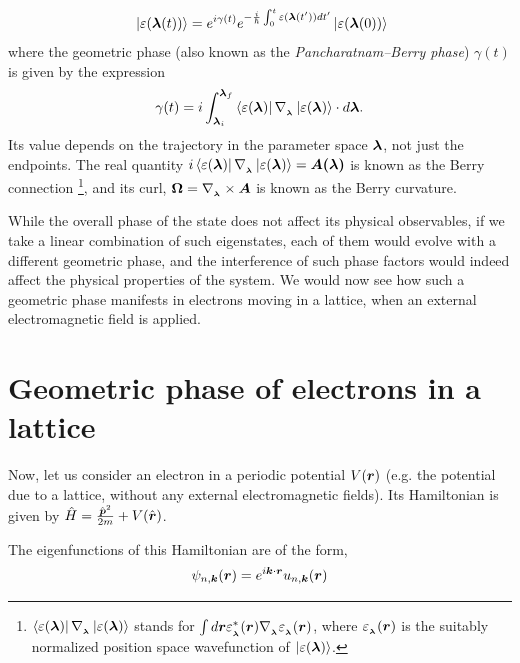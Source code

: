 \documentclass{report}
\renewcommand\vec[1]{\ensuremath\boldsymbol{#1}} %
\begin{document}
\begin{equation}~\label{Eq:BerryPhaseOriginal}
	\ket{\varepsilon(\vec{\lambda}(t))} = e^{i \gamma(t)} e^{-\frac{i}{\hbar} \int_0^t \varepsilon(\vec{\lambda}(t')) dt'} \ket{\varepsilon(\vec{\lambda}(0))}
\end{equation}
where the geometric phase (also known as the \textit{Pancharatnam–Berry phase}) $\gamma(t)$ is given by the expression $$\gamma(t) = i\int_{\vec{\lambda}_i}^{\vec{\lambda}_f} \bra{\varepsilon({\vec{\lambda}})}\nabla_{_{\vec{\lambda}}} \ket{\varepsilon({\vec{\lambda}})} \cdot d \vec{\lambda}.$$ Its value depends on the trajectory in the parameter space $\vec{\lambda}$, not just the endpoints. The real quantity $i\bra{\varepsilon({\vec{\lambda}})}\nabla_{_{\vec{\lambda}}}\ket{\varepsilon({\vec{\lambda}})} = \vec{A(\vec{\lambda})}$ is known as the Berry connection  \footnote{$\bra{\varepsilon({\vec{\lambda}})}\nabla_{_{\vec{\lambda}}} \ket{\varepsilon({\vec{\lambda}})}$ stands for $\int d\vec{r} \varepsilon_{_{\vec{\lambda}}}^* (\vec{r}) \nabla_{_{\vec{\lambda}}} \varepsilon_{_{\vec{\lambda}}}(\vec{r})$, where $\varepsilon_{_{\vec{\lambda}}}(\vec{r})$ is the suitably normalized position space wavefunction of $\ket{\varepsilon({\vec{\lambda}})}$.}, and its curl, $\vec{\Omega} = \nabla_{_{\vec{\lambda}}} \times \vec{A}$ is known as the Berry curvature.

While the overall phase of the state does not affect its physical observables, if we take a linear combination of such eigenstates, each of them would evolve with a different geometric phase, and the interference of such phase factors would indeed affect the physical properties of the system. We would now see how such a geometric phase manifests in electrons moving in a lattice, when an external electromagnetic field is applied.

\section{Geometric phase of electrons in a lattice}
Now, let us consider an electron in a periodic potential $V(\vec{r})$ (e.g. the potential due to a lattice, without any external electromagnetic fields). Its Hamiltonian is given by $\hat{H} = \frac{{\hat{\vec{p}}}^2}{2 m} + V(\hat{\vec{r}})$.

The eigenfunctions of this Hamiltonian are of the form,
$$\psi_{n, \vec{k}} (\vec{r}) = e^{i \vec{k}\cdot \vec{r}} u_{n,\vec{k}} (\vec{r})$$
\end{document}
